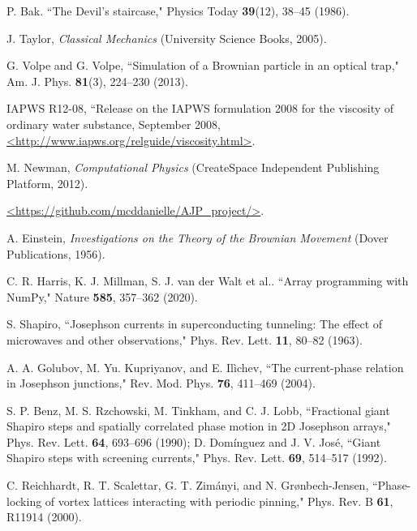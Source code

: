 \documentclass[preprint,showpacs,preprintnumbers,amsmath,amssymb,aps,prb]{revtex4-1}
\theoremstyle{remark}
\begin{document}
\begin{thebibliography}{99}
   P. Bak. ``The Devil's staircase," Physics Today {\bf 39}(12), 38--45 (1986).

   J. Taylor,  {\it Classical Mechanics} (University Science Books, 2005).

   G. Volpe and G. Volpe, ``Simulation of a Brownian particle in an optical trap,"  Am. J. Phys. {\bf 81}(3), 224--230 (2013).

    IAPWS R12-08, 
    ``Release on the IAPWS formulation 2008 for the viscosity of ordinary water substance,  September 2008,
    \url{<http://www.iapws.org/relguide/viscosity.html>}.

   M. Newman, {\it Computational Physics} (CreateSpace Independent Publishing Platform, 2012).

    \url{<https://github.com/mcddanielle/AJP_project/>}.

   A. Einstein, {\it Investigations on the Theory of the Brownian Movement}  (Dover Publications, 1956).

     C. R. Harris, K. J. Millman, S. J. van der Walt et al.. ``Array programming with NumPy,"  Nature {\bf 585}, 357--362 (2020). %
      
     S. Shapiro, ``Josephson currents in superconducting tunneling: The effect of microwaves and other observations," Phys. Rev. Lett. {\bf 11}, 80--82 (1963).

     A. A. Golubov, M. Yu. Kupriyanov, and E. Il{\`i}chev, ``The current-phase relation in Josephson junctions," Rev. Mod. Phys. {\bf 76}, 411--469 (2004).

      S. P. Benz, M. S. Rzchowski, M. Tinkham, and C. J. Lobb, ``Fractional giant Shapiro steps and spatially correlated phase motion in 2D Josephson arrays," Phys. Rev. Lett. {\bf 64}, 693--696 (1990); D. Dom{\'i}nguez and J. V. Jos{\'e}, ``Giant Shapiro steps with screening currents," Phys. Rev. Lett. {\bf 69}, 514--517 (1992).

     C. Reichhardt, R. T. Scalettar, G. T. Zim{\'a}nyi, and N. Gr{\o}nbech-Jensen,  ``Phase-locking of vortex lattices interacting with periodic pinning,"  Phys. Rev. B {\bf 61}, R11914 (2000).
     

\end{thebibliography}
\end{document}
